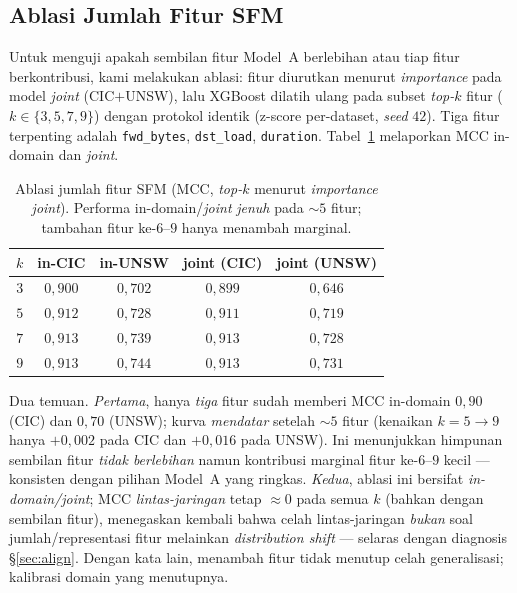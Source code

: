 \documentclass[11pt,a4paper]{article}
\begin{document}
\subsection{Ablasi Jumlah Fitur SFM}
\label{sec:ablation}

Untuk menguji apakah sembilan fitur Model~A berlebihan atau tiap fitur berkontribusi,
kami melakukan ablasi: fitur diurutkan menurut \emph{importance} pada model
\emph{joint} (CIC$+$UNSW), lalu XGBoost dilatih ulang pada subset \emph{top-}$k$ fitur
($k\in\{3,5,7,9\}$) dengan protokol identik (z-score per-dataset, \emph{seed} $42$).
Tiga fitur terpenting adalah \texttt{fwd\_bytes}, \texttt{dst\_load}, \texttt{duration}.
Tabel~\ref{tab:ablation} melaporkan MCC in-domain dan \emph{joint}.

\begin{table}[h]
\centering
\caption{Ablasi jumlah fitur SFM (MCC, \emph{top-}$k$ menurut \emph{importance}
\emph{joint}). Performa in-domain/\emph{joint} \emph{jenuh} pada $\sim$$5$ fitur;
tambahan fitur ke-$6$--$9$ hanya menambah marginal.}
\label{tab:ablation}
\begin{tabular}{ccccc}
\toprule
$k$ & in-CIC & in-UNSW & joint (CIC) & joint (UNSW) \\
\midrule
$3$ & $0{,}900$ & $0{,}702$ & $0{,}899$ & $0{,}646$ \\
$5$ & $0{,}912$ & $0{,}728$ & $0{,}911$ & $0{,}719$ \\
$7$ & $0{,}913$ & $0{,}739$ & $0{,}913$ & $0{,}728$ \\
$9$ & $0{,}913$ & $0{,}744$ & $0{,}913$ & $0{,}731$ \\
\bottomrule
\end{tabular}
\end{table}

Dua temuan. \emph{Pertama}, hanya \emph{tiga} fitur sudah memberi MCC in-domain
$0{,}90$ (CIC) dan $0{,}70$ (UNSW); kurva \emph{mendatar} setelah $\sim$$5$ fitur
(kenaikan $k{=}5\!\to\!9$ hanya $+0{,}002$ pada CIC dan $+0{,}016$ pada UNSW). Ini
menunjukkan himpunan sembilan fitur \emph{tidak berlebihan} namun kontribusi
marginal fitur ke-$6$--$9$ kecil --- konsisten dengan pilihan Model~A yang ringkas.
\emph{Kedua}, ablasi ini bersifat \emph{in-domain/joint}; MCC \emph{lintas-jaringan}
tetap $\approx 0$ pada semua $k$ (bahkan dengan sembilan fitur), menegaskan kembali
bahwa celah lintas-jaringan \emph{bukan} soal jumlah/representasi fitur melainkan
\emph{distribution shift} --- selaras dengan diagnosis \S\ref{sec:align}. Dengan kata
lain, menambah fitur tidak menutup celah generalisasi; kalibrasi domain yang menutupnya.\ifadversarial
\end{document}
